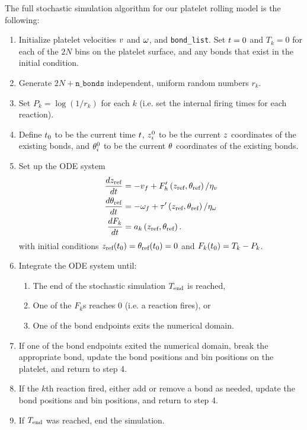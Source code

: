 \documentclass{article}
\newcommand{\dd}{d}
\newcommand{\Der}[2]{\frac{\dd #1}{\dd #2}}
\newcommand{\tn}{\textnormal}
\begin{document}
The full stochastic simulation algorithm for our platelet rolling
model is the following:
\begin{enumerate}
\item Initialize platelet velocities $v$ and $\omega$,
  and \verb|bond_list|. Set $t = 0$ and $T_k = 0$ for each of the
  $2N$ bins on the platelet surface, and any bonds that exist in the
  initial condition.
\item Generate $2N + \mathtt{n\_bonds}$ independent, uniform random
  numbers $r_k$.
\item Set $P_k = \log(1/r_k)$ for each $k$ (i.e. set the internal
  firing times for each reaction).
\item Define $t_0$ to be the current time $t$,
  $z_i^0$ to be the current $z$ coordinates of the
  existing bonds, and $\theta_i^0$ to be the current $\theta$
  coordinates of the existing bonds.
\item Set up the ODE system
  \begin{align}
    \Der{\ndWallDist_\tn{ref}}{\dTime}
    &= -\ndAppliedVel + F_h'\left(\ndWallDist_\tn{ref},
      \recAngle_\tn{ref} \right)/\ndVelFriction \\
    \Der{\recAngle_\tn{ref}}{\dTime}
    &= -\ndAppliedRot + \tau'\left(\ndWallDist_\tn{ref},
      \recAngle_\tn{ref} \right)/\ndRotFriction \\
    \Der{F_k}{\dTime} &= a_k\left(\ndWallDist_\tn{ref},
    \recAngle_\tn{ref} \right).
  \end{align}
  with initial conditions $\ndWallDist_\tn{ref}(\dTime_0) =
  \recAngle_\tn{ref}(\dTime_0) = 0$ and $F_k(t_0) = T_k - P_k$. 
\item Integrate the ODE system until:
  \begin{enumerate}
  \item The end of the stochastic simulation $T_\tn{end}$ is reached,
  \item One of the $F_k$s reaches 0 (i.e. a reaction fires), or
  \item One of the bond endpoints exits the numerical domain.
  \end{enumerate}
\item If one of the bond endpoints exited the numerical domain, break
  the appropriate bond, update the bond positions and bin positions on
  the platelet, and return to step 4.
\item If the $k$th reaction fired, either add or remove a bond as
  needed, update the bond positions and bin positions, and return to
  step 4.
\item If $T_\tn{end}$ was reached, end the simulation. 
\end{enumerate}


\end{document}
